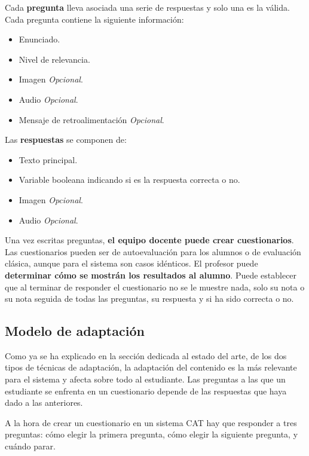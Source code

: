 Cada \textbf{pregunta} lleva asociada una serie de respuestas y solo una es la válida. Cada pregunta contiene la siguiente información:

\begin{itemize}
	\item Enunciado.
	\item Nivel de relevancia.
	\item Imagen \textit{Opcional}.
	\item Audio \textit{Opcional}.
	\item Mensaje de retroalimentación \textit{Opcional}.
\end{itemize}

Las \textbf{respuestas} se componen de:

\begin{itemize}
	\item Texto principal.
	\item Variable booleana indicando si es la respuesta correcta o no.
	\item Imagen \textit{Opcional}.
	\item Audio \textit{Opcional}.
\end{itemize}

Una vez escritas preguntas, \textbf{el equipo docente puede crear cuestionarios}. Las cuestionarios pueden ser de autoevaluación para los alumnos o de evaluación clásica, aunque para el sistema son casos idénticos. El profesor puede \textbf{determinar cómo se mostrán los resultados al alumno}. Puede establecer que al terminar de responder el cuestionario no se le muestre nada, solo su nota o su nota seguida de todas las preguntas, su respuesta y si ha sido correcta o no.


\subsection{Modelo de adaptación\label{sec:modelo adapatacion}}

Como ya se ha explicado en la sección dedicada al estado del arte, de los dos tipos de técnicas de adaptación, la adaptación del contenido es la más relevante para el sistema y afecta sobre todo al estudiante. Las preguntas a las que un estudiante se enfrenta en un cuestionario depende de las respuestas que haya dado a las anteriores.

A la hora de crear un cuestionario en un sistema \acrshort{CAT} hay que responder a tres preguntas: cómo elegir la primera pregunta, cómo elegir la siguiente pregunta, y cuándo parar.

